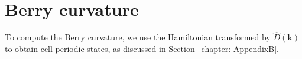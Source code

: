 















\section{Berry curvature}
\label{section: Berrycurv}
To compute the Berry curvature, we use the Hamiltonian transformed by $\hat{D}(\mathbf{k})$ to obtain cell-periodic states, as discussed in Section~\ref{chapter: AppendixB}.


